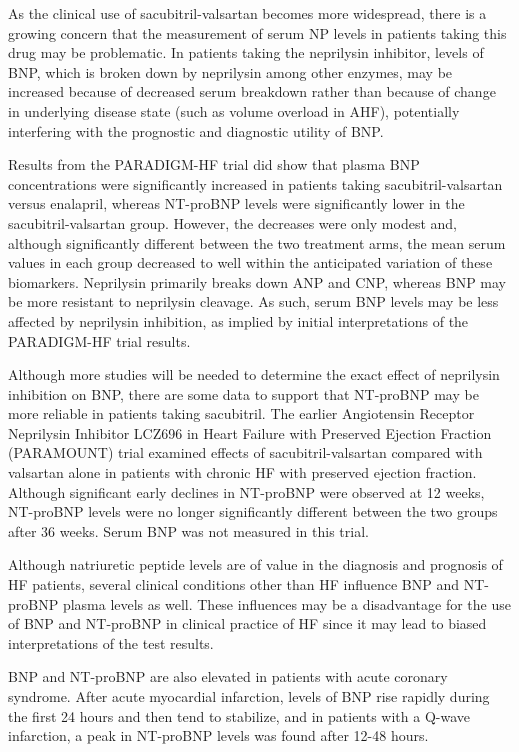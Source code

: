 \documentclass[14pt,a4paper,onecolumn]{extarticle}
\begin{document}
As the clinical use of sacubitril-valsartan becomes more widespread, there is a growing concern that the measurement of serum NP levels in patients taking this drug may be problematic. In patients taking the neprilysin inhibitor, levels of BNP, which is broken down by neprilysin among other enzymes, may be increased because of decreased serum breakdown rather than because of change in underlying disease state (such as volume overload in AHF), potentially interfering with the prognostic and diagnostic utility of BNP.  \citep{Mckie2016} %

Results from the PARADIGM-HF trial did show that plasma BNP concentrations were significantly increased in patients taking sacubitril-valsartan versus enalapril, whereas NT-proBNP levels were significantly lower in the sacubitril-valsartan group.  However, the decreases were only modest and, although significantly different between the two treatment arms, the mean serum values in each group decreased to well within the anticipated variation of these biomarkers.  Neprilysin primarily breaks down ANP and CNP, whereas BNP may be more resistant to neprilysin cleavage.  As such, serum BNP levels may be less affected by neprilysin inhibition, as implied by initial interpretations of the PARADIGM-HF trial results. \citep{Maisel2018}

Although more studies will be needed to determine the exact effect of neprilysin inhibition on BNP, there are some data to support that NT-proBNP may be more reliable in patients taking sacubitril.  The earlier Angiotensin Receptor Neprilysin Inhibitor LCZ696 in Heart Failure with Preserved Ejection Fraction (PARAMOUNT) trial examined effects of sacubitril-valsartan compared with valsartan alone in patients with chronic HF with preserved ejection fraction. Although significant early declines in NT-proBNP were observed at 12 weeks, NT-proBNP levels were no longer significantly different between the two groups after 36 weeks. Serum BNP was not measured in this trial.  \citep{Maisel2018}

Although natriuretic peptide levels are of value in the diagnosis and prognosis of HF patients, several clinical conditions other than HF influence BNP and NT-proBNP plasma levels as well. These influences may be a disadvantage for the use of BNP and NT-proBNP in clinical practice of HF since it may lead to biased interpretations of the test results.

BNP and NT-proBNP are also elevated in patients with acute coronary syndrome. After acute myocardial infarction, levels of BNP rise rapidly during the first 24 hours and then tend to stabilize, \citep{deLemos2001} and in patients with a Q-wave infarction, a peak in NT-proBNP levels was found after 12-48 hours. \citep{Talwar2000}
\end{document}
